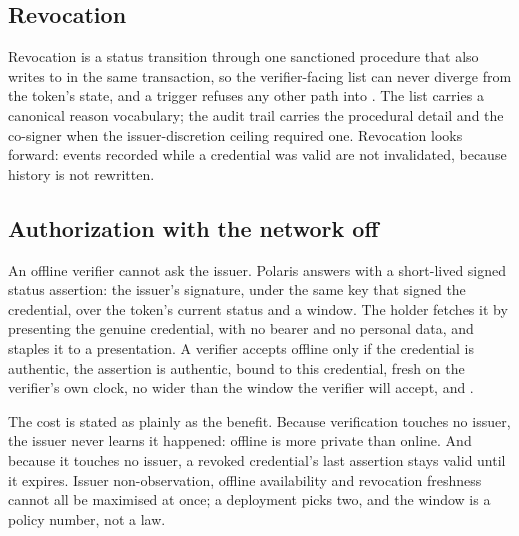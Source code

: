 \subsection{Revocation}

Revocation is a status transition through one sanctioned procedure that also writes to
 in the same transaction, so the verifier-facing list can never diverge from
the token's state, and a trigger refuses any other path into . The list carries a
canonical reason vocabulary; the audit trail carries the procedural detail and the co-signer when
the issuer-discretion ceiling required one. Revocation looks forward: events recorded while a
credential was valid are not invalidated, because history is not rewritten. \sImpl

\subsection{Authorization with the network off}

An offline verifier cannot ask the issuer. Polaris answers with a short-lived signed status
assertion: the issuer's signature, under the same key that signed the credential, over the token's
current status and a window. The holder fetches it by presenting the genuine credential, with no
bearer and no personal data, and staples it to a presentation. A verifier accepts offline only if
the credential is authentic, the assertion is authentic, bound to this credential, fresh on the
verifier's own clock, no wider than the window the verifier will accept, and .
\sImpl

The cost is stated as plainly as the benefit. Because verification touches no issuer, the issuer
never learns it happened: offline is more private than online. And because it touches no issuer, a
revoked credential's last assertion stays valid until it expires. Issuer non-observation, offline
availability and revocation freshness cannot all be maximised at once; a deployment picks two, and
the window is a policy number, not a law.


